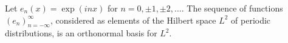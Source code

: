 Let $e_n(x) = \exp(inx)$ for $n = 0, \pm 1, \pm 2, \ldots$. The sequence of functions $(e_n)_{n=-\infty}^{\infty}$, considered as elements of the Hilbert space $L^2$ of periodic distributions, is an orthonormal basis for $L^2$.
